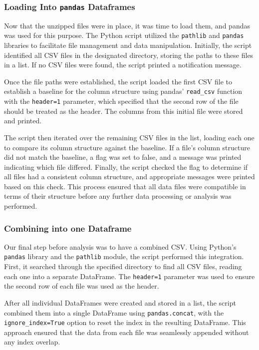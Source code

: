 \documentclass[
]{article}
\begin{document}
\subsubsection{\texorpdfstring{Loading Into \texttt{pandas}
Dataframes}{Loading Into pandas Dataframes}}\label{loading-into-pandas-dataframes}

Now that the unzipped files were in place, it was time to load them, and
pandas was used for this purpose. The Python script utilized the
\texttt{pathlib} and \texttt{pandas} libraries to facilitate file
management and data manipulation. Initially, the script identified all
CSV files in the designated directory, storing the paths to these files
in a list. If no CSV files were found, the script printed a notification
message.

Once the file paths were established, the script loaded the first CSV
file to establish a baseline for the column structure using pandas'
\texttt{read\_csv} function with the \texttt{header=1} parameter, which
specified that the second row of the file should be treated as the
header. The columns from this initial file were stored and printed.

The script then iterated over the remaining CSV files in the list,
loading each one to compare its column structure against the baseline.
If a file's column structure did not match the baseline, a flag was set
to false, and a message was printed indicating which file differed.
Finally, the script checked the flag to determine if all files had a
consistent column structure, and appropriate messages were printed based
on this check. This process ensured that all data files were compatible
in terms of their structure before any further data processing or
analysis was performed.

\subsubsection{Combining into one
Dataframe}\label{combining-into-one-dataframe}

Our final step before analysis was to have a combined CSV. Using
Python's \texttt{pandas} library and the \texttt{pathlib} module, the
script performed this integration. First, it searched through the
specified directory to find all CSV files, reading each one into a
separate DataFrame. The \texttt{header=1} parameter was used to ensure
the second row of each file was used as the header.

After all individual DataFrames were created and stored in a list, the
script combined them into a single DataFrame using
\texttt{pandas.concat}, with the \texttt{ignore\_index=True} option to
reset the index in the resulting DataFrame. This approach ensured that
the data from each file was seamlessly appended without any index
overlap.
\end{document}
